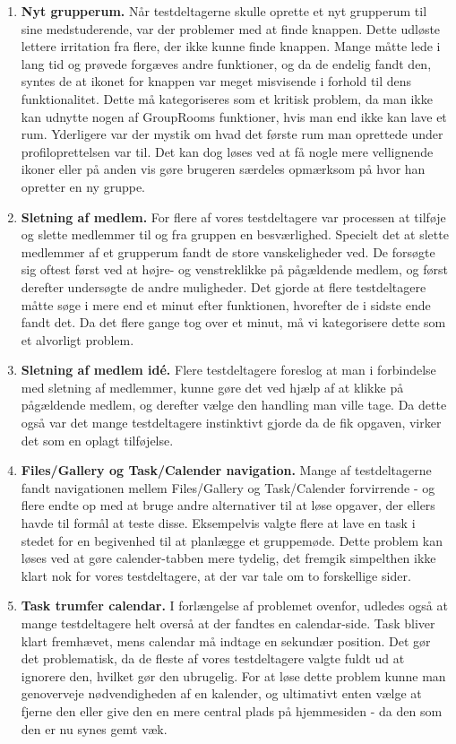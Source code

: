 \documentclass[12pt]{article}
\begin{document}
\begin{enumerate}
  \item \textbf{Nyt grupperum.} Når testdeltagerne skulle oprette et nyt grupperum til sine medstuderende, var der problemer med at finde knappen. Dette udløste lettere irritation fra flere, der ikke kunne finde knappen. Mange måtte lede i lang tid og prøvede forgæves andre funktioner, og da de endelig fandt den, syntes de at ikonet for knappen var meget misvisende i forhold til dens funktionalitet. Dette må kategoriseres som et kritisk problem, da man ikke kan udnytte nogen af GroupRooms funktioner, hvis man end ikke kan lave et rum. Yderligere var der mystik om hvad det første rum man oprettede under profiloprettelsen var til. Det kan dog løses ved at få nogle mere vellignende ikoner eller på anden vis gøre brugeren særdeles opmærksom på hvor han opretter en ny gruppe.
  
  \item \textbf{Sletning af medlem.} For flere af vores testdeltagere var processen at tilføje og slette medlemmer til og fra gruppen en besværlighed. Specielt det at slette medlemmer af et grupperum fandt de store vanskeligheder ved. De forsøgte sig oftest først ved at højre- og venstreklikke på pågældende medlem, og først derefter undersøgte de andre muligheder. Det gjorde at flere testdeltagere måtte søge i mere end et minut efter funktionen, hvorefter de i sidste ende fandt det. Da det flere gange tog over et minut, må vi kategorisere dette som et alvorligt problem.
  
  \item \textbf{Sletning af medlem idé.} Flere testdeltagere foreslog at man i forbindelse med sletning af medlemmer, kunne gøre det ved hjælp af at klikke på pågældende medlem, og derefter vælge den handling man ville tage. Da dette også var det mange testdeltagere instinktivt gjorde da de fik opgaven, virker det som en oplagt tilføjelse.
  
  \item \textbf{Files/Gallery og Task/Calender navigation.} Mange af testdeltagerne fandt navigationen mellem Files/Gallery og Task/Calender forvirrende - og flere endte op med at bruge andre alternativer til at løse opgaver, der ellers havde til formål at teste disse. Eksempelvis valgte flere at lave en task i stedet for en begivenhed til at planlægge et gruppemøde. Dette problem kan løses ved at gøre calender-tabben mere tydelig, det fremgik simpelthen ikke klart nok for vores testdeltagere, at der var tale om to forskellige sider.

  \item \textbf{Task trumfer calendar.} I forlængelse af problemet ovenfor, udledes også at mange testdeltagere helt overså at der fandtes en calendar-side. Task bliver klart fremhævet, mens calendar må indtage en sekundær position. Det gør det problematisk, da de fleste af vores testdeltagere valgte fuldt ud at ignorere den, hvilket gør den ubrugelig. For at løse dette problem kunne man genoverveje nødvendigheden af en kalender, og ultimativt enten vælge at fjerne den eller give den en mere central plads på hjemmesiden - da den som den er nu synes gemt væk.
  

\end{enumerate}
\end{document}
